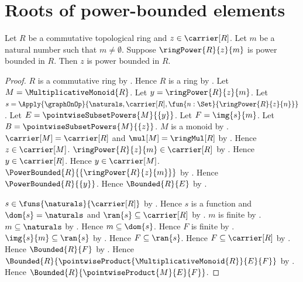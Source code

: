 


\section{Roots of power-bounded elements}

\begin{theorem}\label{power_bounded_root}
    Let $R$ be a commutative topological ring and $z\in\carrier[R]$.
    Let $m$ be a natural number such that $m\neq\emptyset$.
    Suppose $\ringPower{R}{z}{m}$ is power bounded in $R$.
    Then $z$ is power bounded in $R$.
\end{theorem}
\begin{proof}
    $R$ is a commutative ring by
        .
    Hence $R$ is a ring by .
    Let $M=\MultiplicativeMonoid{R}$.
    Let $y=\ringPower{R}{z}{m}$.
    Let $s=\Apply{\graphOnOp}{
        \naturals,\carrier[R],
        \fun{n:\Set}{\ringPower{R}{z}{n}}}$.
    Let $E=\pointwiseSubsetPowers{M}{\{y\}}$.
    Let $F=\img{s}{m}$.
    Let $B=\pointwiseSubsetPowers{M}{\{z\}}$.
    $M$ is a monoid by .
    $\carrier[M]=\carrier[R]$ and $\mul[M]=\ringMul[R]$ by
        .
    Hence $z\in\carrier[M]$.
    $\ringPower{R}{z}{m}\in\carrier[R]$ by .
    Hence $y\in\carrier[R]$.
    Hence $y\in\carrier[M]$.
    $\PowerBounded{R}{\{\ringPower{R}{z}{m}\}}$ by
        .
    Hence $\PowerBounded{R}{\{y\}}$.
    Hence $\Bounded{R}{E}$ by
        .

    $s\in\funs{\naturals}{\carrier[R]}$ by
        .
    Hence $s$ is a function and $\dom{s}=\naturals$ and
        $\ran{s}\subseteq\carrier[R]$ by .
    $m$ is finite by .
    $m\subseteq\naturals$ by
        .
    Hence $m\subseteq\dom{s}$.
    Hence $F$ is finite by .
    $\img{s}{m}\subseteq\ran{s}$ by .
    Hence $F\subseteq\ran{s}$.
    Hence $F\subseteq\carrier[R]$ by .
    Hence $\Bounded{R}{F}$ by .
    Hence $\Bounded{R}{\pointwiseProduct{
        \MultiplicativeMonoid{R}}{E}{F}}$ by
        .
    Hence $\Bounded{R}{\pointwiseProduct{M}{E}{F}}$.


\end{proof}

